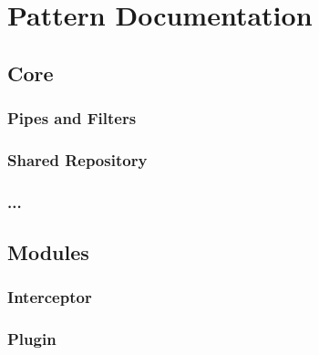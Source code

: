 
\clearpage
\chapter{Pattern Documentation}
\label{ch:patterns}


\section{Core}
\subsection{Pipes and Filters}
\subsection{Shared Repository}
\subsection{...}


\section{Modules}
\subsection{Interceptor}
\subsection{Plugin}

